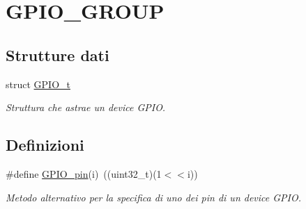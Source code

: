 \hypertarget{group___g_p_i_o___g_r_o_u_p}{\section{G\+P\+I\+O\+\_\+\+G\+R\+O\+U\+P}
\label{group___g_p_i_o___g_r_o_u_p}
}
\subsection*{Strutture dati}
\begin{DoxyCompactItemize}
\item 
struct \hyperlink{struct_g_p_i_o__t}{G\+P\+I\+O\+\_\+t}
\begin{DoxyCompactList}\small\item\em Struttura che astrae un device G\+P\+I\+O. \end{DoxyCompactList}\end{DoxyCompactItemize}
\subsection*{Definizioni}
\begin{DoxyCompactItemize}
\item 
\#define \hyperlink{group___g_p_i_o___g_r_o_u_p_ga8ac4b8e7e6313a8b139ef0e9f9781a0b}{G\+P\+I\+O\+\_\+pin}(i)~((uint32\+\_\+t)(1$<$$<$i))
\begin{DoxyCompactList}\small\item\em Metodo alternativo per la specifica di uno dei pin di un device G\+P\+I\+O. \end{DoxyCompactList}\end{DoxyCompactItemize}
